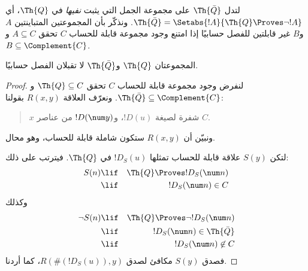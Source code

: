 \documentclass[../../../include/open-logic-section]{subfiles}
\begin{document}



لتدل $\Th{\bar Q}$ على مجموعة الجمل التي يثبت { \em نفيها}
في $\Th{Q}$، أي
$\Th{\bar Q}=\Setabs{!A}{\Th{Q}\Proves\lnot !A}$. ونذكّر بأن
المجموعتين المتباينتين $A$ و$B$ غير قابلتين للفصل حسابيًا إذا امتنع
وجود مجموعة قابلة للحساب $C$ تحقق $A\subseteq C$ و
$B\subseteq\Complement{C}$.

\begin{lem}
المجموعتان $\Th{Q}$ و$\Th{\bar Q}$ لا تقبلان الفصل حسابيًا.
\end{lem}

\begin{proof}
لنفرض وجود مجموعة قابلة للحساب $C$ تحقق $\Th{Q}\subseteq C$ و
$\Th{\bar Q}\subseteq\Complement{C}$. ونعرّف العلاقة $R(x,y)$ بقولنا:
\begin{quote}
$x$ شفرة لصيغة $!D(u)$، و$!D(\num y)$ من عناصر $C$.
\end{quote}
ونبيّن أن $R(x,y)$ ستكون شاملة قابلة للحساب، وهو محال.

لتكن $S(y)$ علاقة قابلة للحساب تمثلها $!D_S(u)$ في $\Th{Q}$.
فيترتب على ذلك:
\begin{eqnarray*}
S(n) & \lif & \Th{Q} \Proves !D_S(\num n) \\
& \lif & !D_S(\num n) \in C
\end{eqnarray*}
وكذلك
\begin{eqnarray*}
\lnot S(n) & \lif & \Th{Q} \Proves \lnot !D_S(\num n) \\
& \lif & !D_S(\num n) \in \Th{\bar Q} \\
& \lif & !D_S(\num n) \not\in C
\end{eqnarray*}
فصدق $S(y)$ مكافئ لصدق $R(\#(!D_S(u)),y)$، كما أردنا.
\end{proof}
\end{document}
